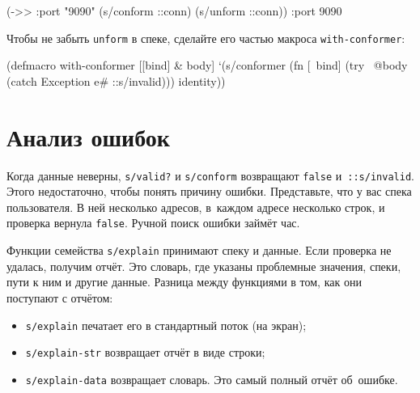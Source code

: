 \begin{english}
  \begin{clojure}
(->> {:port "9090"}
     (s/conform ::conn)
     (s/unform ::conn))
{:port 9090}
  \end{clojure}
\end{english}

Чтобы не забыть \verb|unform| в спеке, сделайте его частью макроса
\verb|with-conformer|:

\begin{english}
  \begin{clojure}
(defmacro with-conformer
  [[bind] & body]
  `(s/conformer
    (fn [~bind]
      (try
        ~@body
        (catch Exception e#
          ::s/invalid)))
    identity))
  \end{clojure}
\end{english}

\section{Анализ ошибок}


\label{spec-explain}

Когда данные неверны, \verb|s/valid?| и \verb|s/conform| возвращают \verb|false|
и~\verb|::s/invalid|. Этого недостаточно, чтобы понять причину
ошибки. Представьте, что у вас спека пользователя. В ней несколько адресов,
в~каждом адресе несколько строк, и проверка вернула \verb|false|. Ручной поиск
ошибки займёт час.

Функции семейства \verb|s/explain| принимают спеку и данные. Если проверка не
удалась, получим отчёт. Это словарь, где указаны проблемные значения, спеки,
пути к ним и другие данные. Разница между функциями в том, как они поступают с
отчётом:

\begin{itemize}


\item
  \verb|s/explain| печатает его в стандартный поток (на экран);

\item
  \verb|s/explain-str| возвращает отчёт в виде строки;

\item
  \verb|s/explain-data| возвращает словарь. Это самый полный отчёт об~ошибке.

\end{itemize}

